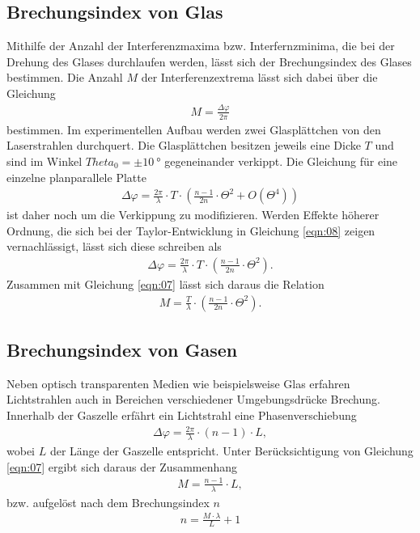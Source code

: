 \subsection{Brechungsindex von Glas}
\noindent Mithilfe der Anzahl der Interferenzmaxima bzw. Interfernzminima, die
bei der Drehung des Glases durchlaufen werden, lässt sich der Brechungsindex des
Glases bestimmen. Die Anzahl $M$ der Interferenzextrema lässt sich dabei über die
Gleichung
\begin{align}
  M = \frac{\Delta \varphi}{2 \pi}
  \label{eqn:07}
\end{align}
\noindent bestimmen. Im experimentellen Aufbau werden zwei Glasplättchen von den
Laserstrahlen durchquert. Die Glasplättchen besitzen jeweils eine Dicke $T$ und
sind im Winkel $Theta_0 = \pm \SI{10}{\degree}$ gegeneinander verkippt. Die
Gleichung für eine einzelne planparallele Platte
\begin{align}
  \Delta \varphi = \frac{2 \pi}{\lambda} \cdot T \cdot \left(\frac{n-1}{2n} \cdot \Theta^2 + O(\Theta^4)  \right)
  \label{eqn:08}
\end{align}
\noindent ist daher noch um die Verkippung zu modifizieren. Werden
Effekte höherer Ordnung, die sich bei der Taylor-Entwicklung in Gleichung
\ref{eqn:08} zeigen vernachlässigt, lässt sich diese schreiben als
\begin{align}
  \Delta \varphi = \frac{2 \pi}{\lambda} \cdot T \cdot \left(\frac{n-1}{2n} \cdot \Theta^2  \right).
  \label{eqn:09}
\end{align}
\noindent Zusammen mit Gleichung \ref{eqn:07} lässt sich daraus die Relation
\begin{align}
  M = \frac{T}{\lambda} \cdot \left( \frac{n-1}{2n} \cdot \Theta^2  \right).
  \label{eqn:10}
\end{align}
\subsection{Brechungsindex von Gasen}
\noindent Neben optisch transparenten Medien wie beispielsweise Glas erfahren
Lichtstrahlen auch in Bereichen verschiedener Umgebungsdrücke Brechung.
Innerhalb der Gaszelle erfährt ein Lichtstrahl eine Phasenverschiebung
\begin{align}
  \Delta \varphi = \frac{2 \pi}{\lambda} \cdot (n - 1) \cdot L,
  \label{eqn:11}
\end{align}
\noindent wobei $L$ der Länge der Gaszelle entspricht. Unter Berücksichtigung
von Gleichung \ref{eqn:07} ergibt sich daraus der Zusammenhang
\begin{align}
  M = \frac{n-1}{\lambda} \cdot L,
  \label{eqn:12}
\end{align}
\noindent bzw. aufgelöst nach dem Brechungsindex $n$
\begin{align}
  n = \frac{M \cdot \lambda}{L} + 1
  \label{eqn:13}
\end{align}

